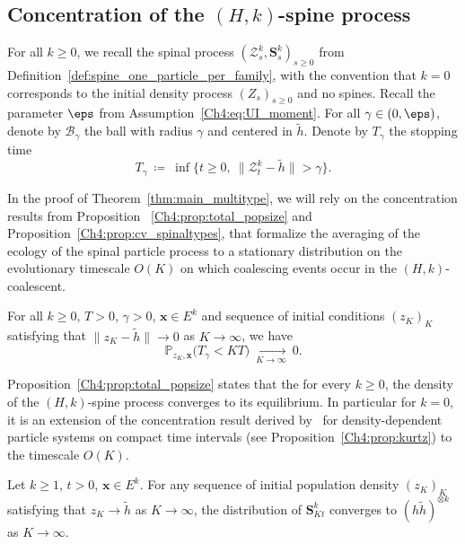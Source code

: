 \begin{refsegment}
\subsection{Concentration of the $(H,k)$-spine process}\label{Ch4:sec:heuristics_concentration}

For all $k\geq 0$, we recall the spinal process $(\mathcal Z^k_s,\bm S^k_s)_{s\geq 0}$ from Definition~\ref{def:spine_one_particle_per_family}, with the convention that $k=0$ corresponds to the initial density process $(Z_s)_{s\geq 0}$ and no spines.
Recall the parameter $\eps$ from Assumption~\ref{Ch4:eq:UI_moment}. For all $\gamma\in (0,\eps)$, denote by $\mathscr{B}_{\gamma}$ the ball with radius $\gamma$ and centered in $\tilde h$. Denote by $T_{\gamma}$ the stopping time
\begin{equation*}
      T_{\gamma} \ \coloneqq\ \inf\big\{t\geq 0,\ \lVert \mathcal{Z}^k_t-\tilde h\rVert > \gamma \big\}.
\end{equation*}

In the proof of Theorem~\ref{thm:main_multitype}, we will rely on the concentration results from Proposition%
~\ref{Ch4:prop:total_popsize} and Proposition~\ref{Ch4:prop:cv_spinaltypes}, that formalize the averaging of the ecology of the spinal particle process to a stationary distribution on the evolutionary timescale $O(K)$ on which coalescing events occur in the $(H,k)$-coalescent.

\begin{prop}\label{Ch4:prop:total_popsize}
 For all $k\geq 0$,  $T>0$, $\gamma>0$, $\bm x\in E^k$ and sequence of initial conditions $(z_K)_K$ satisfying that $\lVert  z_K-\tilde h\rVert\to 0 $ as $K\to\infty$, we have
\begin{equation*}
    \mathbb{P}_{z_K,\bm x}\big(T_{\gamma}<KT\big)\ \underset{K\to\infty}{\longrightarrow}\ 0. 
\end{equation*} 
\end{prop}
Proposition~\ref{Ch4:prop:total_popsize} states that the for every $k\geq 0$, the density of the $(H,k)$-spine process converges to its equilibrium. In particular for $k=0$, it is an extension of the concentration result derived by~\cite{Kurtz:1978aa} for density-dependent particle systems on compact time intervals (see Proposition~\ref{Ch4:prop:kurtz}) to the timescale $O(K)$.
 
\begin{prop}\label{Ch4:prop:cv_spinaltypes}
Let $k\geq 1$, $t > 0$, $\bm x\in  E^k$. For any sequence of initial population density  $(z_K)_K$ satisfying that $z_K \to \tilde h$ as $K\to\infty$, the distribution of $\bm{S}^k_{Kt}$ converges to $(h\tilde h)^{\otimes k}$ as $K\to\infty$.


\end{prop}
\end{refsegment}
